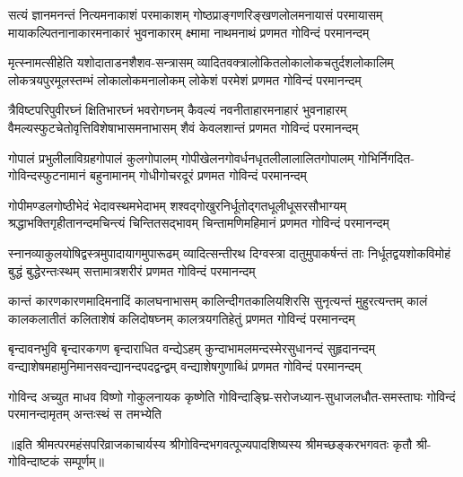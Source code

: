 
\fourlineindentedshloka
{सत्यं ज्ञानमनन्तं नित्यमनाकाशं परमाकाशम्}
{गोष्ठप्राङ्गणरिङ्खणलोलमनायासं परमायासम्}
{मायाकल्पितनानाकारमनाकारं भुवनाकारम्}
{क्ष्मामा नाथमनाथं प्रणमत गोविन्दं परमानन्दम्}

\fourlineindentedshloka
{मृत्स्नामत्सीहेति यशोदाताडनशैशव-सन्त्रासम्}
{व्यादितवक्त्रालोकितलोकालोकचतुर्दशलोकालिम्}
{लोकत्रयपुरमूलस्तम्भं लोकालोकमनालोकम्}
{लोकेशं परमेशं प्रणमत गोविन्दं परमानन्दम्}

\fourlineindentedshloka
{त्रैविष्टपरिपुवीरघ्नं क्षितिभारघ्नं भवरोगघ्नम्}
{कैवल्यं नवनीताहारमनाहारं भुवनाहारम्}
{वैमल्यस्फुटचेतोवृत्तिविशेषाभासमनाभासम्}
{शैवं केवलशान्तं प्रणमत गोविन्दं परमानन्दम्}

\fourlineindentedshloka
{गोपालं प्रभुलीलाविग्रहगोपालं कुलगोपालम्}
{गोपीखेलनगोवर्धनधृतलीलालालितगोपालम्}
{गोभिर्निगदित-गोविन्दस्फुटनामानं बहुनामानम्}
{गोधीगोचरदूरं प्रणमत गोविन्दं परमानन्दम्}

\fourlineindentedshloka
{गोपीमण्डलगोष्ठीभेदं भेदावस्थमभेदाभम्}
{शश्वद्गोखुरनिर्धूतोद्गतधूलीधूसरसौभाग्यम्}
{श्रद्धाभक्तिगृहीतानन्दमचिन्त्यं चिन्तितसद्भावम्}
{चिन्तामणिमहिमानं प्रणमत गोविन्दं परमानन्दम्}

\fourlineindentedshloka
{स्नानव्याकुलयोषिद्वस्त्रमुपादायागमुपारूढम्}
{व्यादित्सन्तीरथ दिग्वस्त्रा दातुमुपाकर्षन्तं ताः}
{निर्धूतद्वयशोकविमोहं बुद्धं बुद्धेरन्तःस्थम्}
{सत्तामात्रशरीरं प्रणमत गोविन्दं परमानन्दम्}

\fourlineindentedshloka
{कान्तं कारणकारणमादिमनादिं कालघनाभासम्}
{कालिन्दीगतकालियशिरसि सुनृत्यन्तं मुहुरत्यन्तम्}
{कालं कालकलातीतं कलिताशेषं कलिदोषघ्नम्}
{कालत्रयगतिहेतुं प्रणमत गोविन्दं परमानन्दम्}

\fourlineindentedshloka
{बृन्दावनभुवि बृन्दारकगण बृन्दाराधित वन्द्येऽहम्}
{कुन्दाभामलमन्दस्मेरसुधानन्दं सुहृदानन्दम्}
{वन्द्याशेषमहामुनिमानसवन्द्यानन्दपदद्वन्द्वम्}
{वन्द्याशेषगुणाब्धिं प्रणमत गोविन्दं परमानन्दम्}

{गोविन्द अच्युत माधव विष्णो गोकुलनायक कृष्णेति}
{गोविन्दाङ्घ्रि-सरोजध्यान-सुधाजलधौत-समस्ताघः}
{गोविन्दं परमानन्दामृतम् अन्तःस्थं स तमभ्येति}

॥इति श्रीमत्परमहंसपरिव्राजकाचार्यस्य श्रीगोविन्दभगवत्पूज्यपादशिष्यस्य 
श्रीमच्छङ्करभगवतः कृतौ श्री-गोविन्दाष्टकं सम्पूर्णम्॥